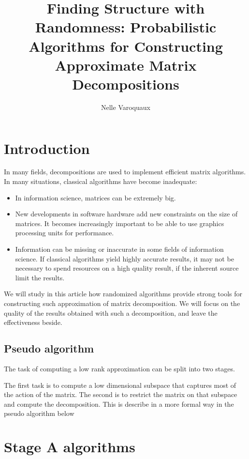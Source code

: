 \documentclass[onecolumn,12pt]{article}
\author{Nelle Varoquaux}
\title{Finding Structure with Randomness: Probabilistic Algorithms for
Constructing Approximate Matrix Decompositions}
\begin{document}
\maketitle
\begin{abstract}
\it{}
\end{abstract}

\tableofcontents

\section{Introduction}

In many fields, decompositions are used to implement efficient matrix
algorithms. In many situations, classical algorithms have become inadequate:

\begin{itemize}
\item In information science, matrices can be extremely big.
\item New developments in software hardware add new constraints on the size of
matrices. It becomes increasingly important to be able to use graphics
processing units for performance.
\item Information can be missing or inaccurate in some fields of information
science. If classical algorithms yield highly accurate results, it may not be
necessary to spend resources on a high quality result, if the inherent
source limit the results.
\end{itemize}

We will study in this article how randomized algorithms provide strong tools
for constructing such approximation of matrix decomposition. We will focus on
the quality of the results obtained with such a decomposition, and leave the
effectiveness beside.


\subsection{Pseudo algorithm}
The task of computing a low rank approximation can be split into two stages.

The first task is to compute a low dimensional subspace that captures most of
the action of the matrix. The second is to restrict the matrix on that subspace
and compute the decomposition. This is describe in a more formal way in the
pseudo algorithm below



\section{Stage A algorithms}
\end{document}
